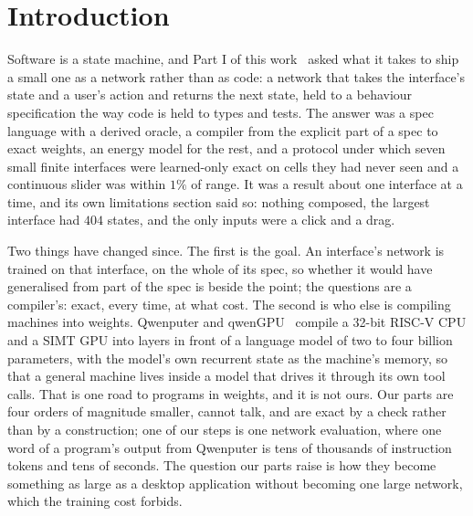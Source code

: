 \section{Introduction}
\label{sec:intro}

Software is a state machine, and Part I of this work~\citep{welcing2026nerve} asked what it takes to ship a small one as a network rather than as code: a network that takes the interface's
state and a user's action and returns the next state, held to a behaviour specification the way code is held
to types and tests. The answer was a spec language with a derived oracle, a compiler from the explicit part of
a spec to exact weights, an energy model for the rest, and a protocol under which seven small finite interfaces were
learned-only exact on cells they had never seen and a continuous slider was within $1\%$ of range. It was a result about one interface at a time, and its own
limitations section said so: nothing composed, the largest interface had $404$ states, and the only inputs
were a click and a drag.

Two things have changed since. The first is the goal. An interface's network is trained on that interface, on
the whole of its spec, so whether it would have generalised from part of the spec is beside the point; the
questions are a compiler's: exact, every time, at what cost. The second is who else is compiling machines into
weights. Qwenputer and qwenGPU~\citep{qwenputer,qwengpu} compile a 32-bit RISC-V CPU and a SIMT GPU into layers
in front of a language model of two to four billion parameters, with the model's own recurrent state as the
machine's memory, so that a general machine lives inside a model that drives it through its own tool calls.
That is one road to programs in weights, and it is not ours. Our parts are four orders of magnitude smaller,
cannot talk, and are exact by a check rather than by a construction; one of our steps is one network
evaluation, where one word of a program's output from Qwenputer is tens of thousands of instruction tokens and
tens of seconds. The question our parts raise is how they become something as large as a desktop application
without becoming one large network, which the training cost forbids.

